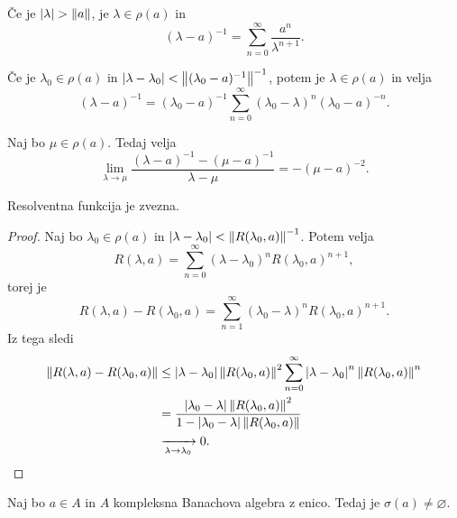 
\begin{opomba}
  Če je $\left| \lambda \right| > \left\lVert a\right\rVert$, je $\lambda \in \rho(a)$ in
  \[
	(\lambda - a)^{-1} = \sum_{n=0}^\infty \frac{a^n}{\lambda^{n+1}}.
  \]
\end{opomba}

\begin{opomba}
  Če je $\lambda_0 \in \rho(a)$ in $\left| \lambda - \lambda_0 \right| < \left\lVert(\lambda_0
	- a)^{-1}\right\rVert^{-1}$, potem je $\lambda \in \rho(a)$ in velja
  \[
	(\lambda - a)^{-1} = (\lambda_0 - a)^{-1} \sum_{n=0}^\infty (\lambda_0 -
	\lambda)^n (\lambda_0 - a)^{-n}.
  \]
\end{opomba}

\begin{trditev}
  Naj bo $\mu \in \rho(a)$.
  Tedaj velja
  \[
	\lim_{\lambda \to \mu} \frac{(\lambda - a)^{-1} - (\mu - a)^{-1}}{\lambda -
	  \mu}
	= -(\mu - a)^{-2}.
  \]
\end{trditev}

\begin{trditev}
  Resolventna funkcija je zvezna.
\end{trditev}

\begin{proof}
  Naj bo $\lambda_0 \in \rho(a)$ in $\left| \lambda - \lambda_0 \right| <
  \left\lVert R(\lambda_0, a)\right\rVert^{-1}$.
  Potem velja
  \[
	R(\lambda,a) = \sum_{n=0}^\infty (\lambda - \lambda_0)^n R(\lambda_0,
	a)^{n+1},
  \]
  torej je
  \[
	R(\lambda, a) - R(\lambda_0, a) = \sum_{n=1}^\infty (\lambda_0 - \lambda)^n
	R(\lambda_0, a)^{n+1}.
  \]
  Iz tega sledi
  \begin{align*}
	\left\lVert R(\lambda, a) - R(\lambda_0, a)\right\rVert
	&\le \left| \lambda - \lambda_0 \right| \left\lVert R(\lambda_0, a)\right\rVert^2 \sum_{n=0}^\infty \left| \lambda - \lambda_0 \right|^n \left\lVert R(\lambda_0, a)\right\rVert^n \\
	&= \frac{\left| \lambda_0 - \lambda \right| \left\lVert R(\lambda_0, a)\right\rVert^2}{1 - \left| \lambda_0 - \lambda \right| \left\lVert R(\lambda_0, a)\right\rVert} \\
	&\xrightarrow[\lambda \to \lambda_0]{} 0.
	  \qedhere
  \end{align*}
\end{proof}


\begin{izrek}
  Naj bo $a \in A$ in $A$ kompleksna Banachova algebra z enico.
  Tedaj je $\sigma(a) \ne \varnothing$.
\end{izrek}

